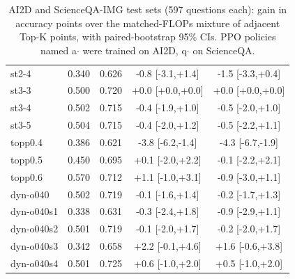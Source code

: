 \begin{table}[t]
\begin{tabular}{lcccc}
st2-4 & 0.340 & 0.626 & -0.8 [-3.1,+1.4] & -1.5 [-3.3,+0.4]\\
st3-3 & 0.500 & 0.720 & +0.0 [+0.0,+0.0] & +0.0 [+0.0,+0.0]\\
st3-4 & 0.502 & 0.715 & -0.4 [-1.9,+1.0] & -0.5 [-2.0,+1.0]\\
st3-5 & 0.504 & 0.715 & -0.4 [-2.0,+1.2] & -0.5 [-2.2,+1.1]\\
topp0.4 & 0.386 & 0.621 & -3.8 [-6.2,-1.4] & -4.3 [-6.7,-1.9]\\
topp0.5 & 0.450 & 0.695 & +0.1 [-2.0,+2.2] & -0.1 [-2.2,+2.1]\\
topp0.6 & 0.570 & 0.712 & +1.1 [-1.0,+3.1] & -0.9 [-3.0,+1.1]\\
dyn-o040 & 0.502 & 0.719 & -0.1 [-1.6,+1.4] & -0.2 [-1.7,+1.3]\\
dyn-o040s1 & 0.338 & 0.631 & -0.3 [-2.4,+1.8] & -0.9 [-2.9,+1.1]\\
dyn-o040s2 & 0.501 & 0.719 & -0.1 [-2.0,+1.7] & -0.2 [-2.0,+1.7]\\
dyn-o040s3 & 0.342 & 0.658 & +2.2 [-0.1,+4.6] & +1.6 [-0.6,+3.8]\\
dyn-o040s4 & 0.501 & 0.725 & +0.6 [-1.0,+2.0] & +0.5 [-1.0,+2.0]\\
\bottomrule\end{tabular}
\caption{AI2D and ScienceQA-IMG test sets (597 questions each): gain in accuracy points over the matched-FLOPs mixture of adjacent Top-K points, with paired-bootstrap 95\% CIs. PPO policies named a$\cdot$ were trained on AI2D, q$\cdot$ on ScienceQA.}\label{tab:mcq}
\end{table}